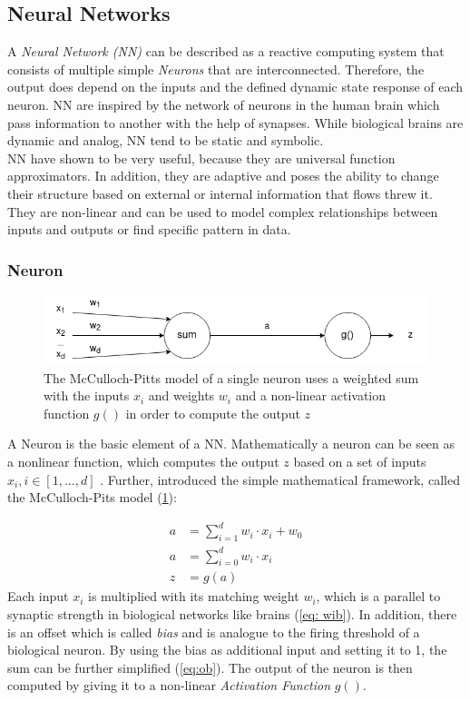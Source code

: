 \subsection{Neural Networks} \label{sec:NN}
A \emph{Neural Network (NN)} can be described as a reactive computing system that consists of multiple simple \emph{Neurons} that are interconnected. 
Therefore, the output does depend on the inputs and the defined dynamic state response of each neuron. 
NN are inspired by the network of neurons in the human brain which pass information to another with the help of synapses. 
While biological brains are dynamic and analog, NN tend to be static and symbolic.\\
NN have shown to be very useful, because they are universal function approximators. In addition, they are adaptive
and poses the ability to change their structure based on external or internal information that flows threw it. 
They are non-linear and can be used to model complex relationships between inputs and outputs or find specific pattern in data.

\subsubsection{Neuron}
\begin{figure}
	\centering
	\includegraphics[width=0.8 \linewidth]{figures/neuron.png}
	\caption{The McCulloch-Pitts model of a single neuron uses a weighted sum with the inputs $x_i$ and weights $w_i$ and a 
	non-linear activation function $g()$ in order to compute the output $z$ \cite{10.1063/1.1144830}}
	\label{fig:neuron}
\end{figure}
A Neuron is the basic element of a NN. 
Mathematically a neuron can be seen as a nonlinear function, 
which computes the output $z$ based on a set of inputs $x_i, i \in [1,...,d]$ \cite{10.1063/1.1144830}. 
Further, \cite{mcculloch1943logical} introduced the simple mathematical framework, called the McCulloch-Pits model (\cref{fig:neuron}):

\begin{align}
	a &= \sum_{i=1}^{d} w_i \cdot x_i + w_0 \label{eq: wib}\\
	a &= \sum_{i=0}^{d} w_i \cdot x_i \label{eq:ob}\\
	z &= g(a) \label{active}
\end{align}
\newline
Each input $x_i$ is multiplied with its matching weight $w_i$, 
which is a parallel to synaptic strength in biological networks like brains (\cref{eq: wib}). 
In addition, there is an offset which is called \emph{bias} and is analogue to the firing threshold of a biological neuron. 
By using the bias as additional input and setting it to 1, the sum can be further simplified (\cref{eq:ob}). 
The output of the neuron is then computed by giving it to a non-linear \emph{Activation Function} $g()$.

